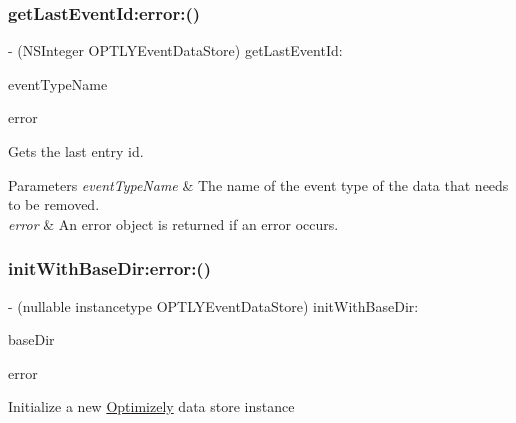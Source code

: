 \subsubsection{\texorpdfstring{get\+Last\+Event\+Id\+:error\+:()}{getLastEventId:error:()}}
{\footnotesize\ttfamily -\/ (N\+S\+Integer O\+P\+T\+L\+Y\+Event\+Data\+Store) get\+Last\+Event\+Id\+: \begin{DoxyParamCaption}\item[{(nonnull N\+S\+String $\ast$)}]{event\+Type\+Name }\item[{error:(N\+S\+Error $\ast$\+\_\+\+Nullable \+\_\+\+\_\+autoreleasing $\ast$\+\_\+\+Nullable)}]{error }\end{DoxyParamCaption}}

Gets the last entry id.


\begin{DoxyParams}{Parameters}
{\em event\+Type\+Name} & The name of the event type of the data that needs to be removed. \\
\hline
{\em error} & An error object is returned if an error occurs. \\
\hline
\end{DoxyParams}
\mbox{\label{protocol_o_p_t_l_y_event_data_store_01-p_a896d8f51ae3ba19b59bf1448301c2df9}} 
\subsubsection{\texorpdfstring{init\+With\+Base\+Dir\+:error\+:()}{initWithBaseDir:error:()}}
{\footnotesize\ttfamily -\/ (nullable instancetype O\+P\+T\+L\+Y\+Event\+Data\+Store) init\+With\+Base\+Dir\+: \begin{DoxyParamCaption}\item[{(nonnull N\+S\+String $\ast$)}]{base\+Dir }\item[{error:(N\+S\+Error $\ast$\+\_\+\+Nullable \+\_\+\+\_\+autoreleasing $\ast$\+\_\+\+Nullable)}]{error }\end{DoxyParamCaption}}

Initialize a new \mbox{\hyperlink{interface_optimizely}{Optimizely}} data store instance


